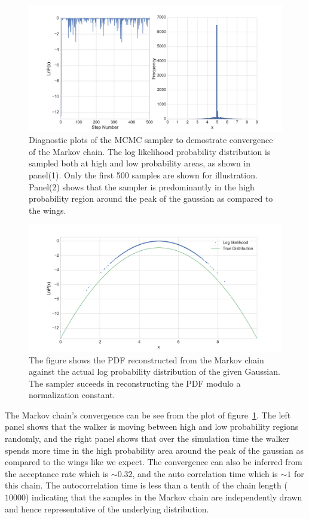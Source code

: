 \documentclass[12pt,usletter,english]{article}
\begin{document}
\begin{figure}[!h]
  \centering \includegraphics[width=13cm]{diagnostics.png}
  \caption{Diagnostic plots of the MCMC sampler to demostrate
    convergence of the Markov chain. The log likelihood probability
    distribution is sampled both at high and low probability areas, as
    shown in panel(1). Only the first 500 samples are shown for
    illustration. Panel(2) shows that the sampler is predominantly in
    the high probability region around the peak of the gaussian as
    compared to the wings.
    \label{fig:diagnostics}}
\end{figure}

\begin{figure}[!h]
  \centering \includegraphics[width=13cm]{dist_mcmc.png}
  \caption{The figure shows the PDF reconstructed from the Markov
    chain against the actual log probability distribution of the given
    Gaussian. The sampler suceeds in reconstructing the PDF modulo a
    normalization constant.
    \label{fig:dist}}
\end{figure}

The Markov chain's convergence can be see from the plot of
figure~\ref{fig:diagnostics}. The left panel shows that the walker is
moving between high and low probability regions randomly, and the
right panel shows that over the simulation time the walker spends more
time in the high probability area around the peak of the gaussian as
compared to the wings like we expect. The convergence can also be
inferred from the acceptance rate which is $\sim 0.32$, and the auto
correlation time which is $\sim 1$ for this chain. The autocorrelation
time is less than a tenth of the chain length ($10000$) indicating
that the samples in the Markov chain are independently drawn and hence
representative of the underlying distribution.
\end{document}
